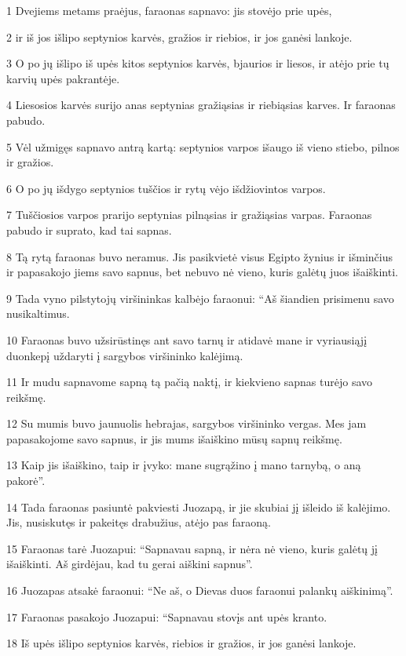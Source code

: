 \par 1 Dvejiems metams praėjus, faraonas sapnavo: jis stovėjo prie upės, 
\par 2 ir iš jos išlipo septynios karvės, gražios ir riebios, ir jos ganėsi lankoje. 
\par 3 O po jų išlipo iš upės kitos septynios karvės, bjaurios ir liesos, ir atėjo prie tų karvių upės pakrantėje. 
\par 4 Liesosios karvės surijo anas septynias gražiąsias ir riebiąsias karves. Ir faraonas pabudo. 
\par 5 Vėl užmigęs sapnavo antrą kartą: septynios varpos išaugo iš vieno stiebo, pilnos ir gražios. 
\par 6 O po jų išdygo septynios tuščios ir rytų vėjo išdžiovintos varpos. 
\par 7 Tuščiosios varpos prarijo septynias pilnąsias ir gražiąsias varpas. Faraonas pabudo ir suprato, kad tai sapnas. 
\par 8 Tą rytą faraonas buvo neramus. Jis pasikvietė visus Egipto žynius ir išminčius ir papasakojo jiems savo sapnus, bet nebuvo nė vieno, kuris galėtų juos išaiškinti. 
\par 9 Tada vyno pilstytojų viršininkas kalbėjo faraonui: “Aš šiandien prisimenu savo nusikaltimus. 
\par 10 Faraonas buvo užsirūstinęs ant savo tarnų ir atidavė mane ir vyriausiąjį duonkepį uždaryti į sargybos viršininko kalėjimą. 
\par 11 Ir mudu sapnavome sapną tą pačią naktį, ir kiekvieno sapnas turėjo savo reikšmę. 
\par 12 Su mumis buvo jaunuolis hebrajas, sargybos viršininko vergas. Mes jam papasakojome savo sapnus, ir jis mums išaiškino mūsų sapnų reikšmę. 
\par 13 Kaip jis išaiškino, taip ir įvyko: mane sugrąžino į mano tarnybą, o aną pakorė”. 
\par 14 Tada faraonas pasiuntė pakviesti Juozapą, ir jie skubiai jį išleido iš kalėjimo. Jis, nusiskutęs ir pakeitęs drabužius, atėjo pas faraoną. 
\par 15 Faraonas tarė Juozapui: “Sapnavau sapną, ir nėra nė vieno, kuris galėtų jį išaiškinti. Aš girdėjau, kad tu gerai aiškini sapnus”. 
\par 16 Juozapas atsakė faraonui: “Ne aš, o Dievas duos faraonui palankų aiškinimą”. 
\par 17 Faraonas pasakojo Juozapui: “Sapnavau stovįs ant upės kranto. 
\par 18 Iš upės išlipo septynios karvės, riebios ir gražios, ir jos ganėsi lankoje. 
